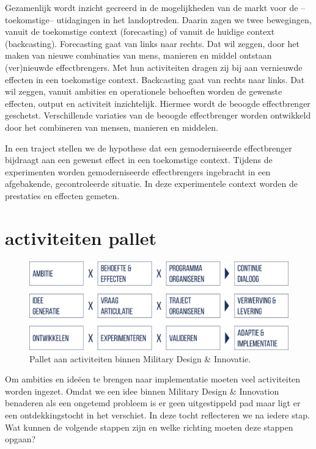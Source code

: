 \documentclass[
]{book}
\begin{document}
Gezamenlijk wordt inzicht gecreerd in de mogelijkheden van de markt voor de --toekomstige-- utidagingen in het landoptreden. Daarin zagen we twee bewegingen, vanuit de toekomstige context (forecasting) of vanuit de huidige context (backcasting). Forecasting gaat van links naar rechts. Dat wil zeggen, door het maken van nieuwe combinaties van mens, manieren en middel ontstaan (ver)nieuwde effectbrengers. Met hun activiteiten dragen zij bij aan vernieuwde effecten in een toekomstige context. Backcasting gaat van rechts naar links. Dat wil zeggen, vanuit ambities en operationele behoeften worden de gewenste effecten, output en activiteit inzichtelijk. Hiermee wordt de beoogde effectbrenger geschetst. Verschillende variaties van de beoogde effectbrenger worden ontwikkeld door het combineren van mensen, manieren en middelen.

In een traject stellen we de hypothese dat een gemoderniseerde effectbrenger bijdraagt aan een gewenst effect in een toekomstige context. Tijdens de experimenten worden gemoderniseerde effectbrengers ingebracht in een afgebakende, gecontroleerde situatie. In deze experimentele context worden de prestaties en effecten gemeten.

\hypertarget{activiteiten-pallet}{%
\section{activiteiten pallet}\label{activiteiten-pallet}}

\begin{figure}
\includegraphics[width=16.61in]{data/images/20210401-MDI-activiteiten-pallet} \caption{Pallet aan activiteiten binnen Military Design \& Innovatie.}\label{fig:unnamed-chunk-17}
\end{figure}

Om ambities en ideëen te brengen naar implementatie moeten veel activiteiten worden ingezet. Omdat we een idee binnen Military Design \& Innovation benaderen als een ongetemd probleem is er geen uitgestippeld pad maar ligt er een ontdekkingstocht in het verschiet. In deze tocht reflecteren we na iedere stap. Wat kunnen de volgende stappen zijn en welke richting moeten deze stappen opgaan?
\end{document}
